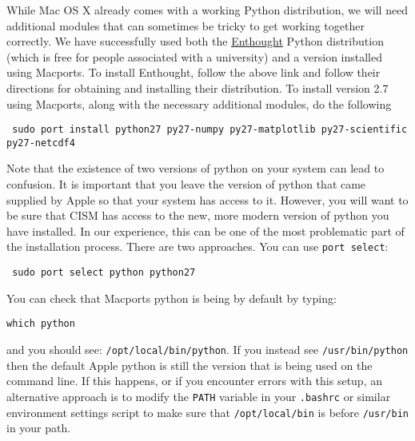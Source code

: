 \begin{mdframed}[style=mac] %
While Mac OS X already comes with a working Python distribution, we will need 
additional modules that can sometimes be tricky to get working together correctly. 
We have successfully used both the 
\href{https://www.enthought.com/products/epd/}{Enthought} Python distribution 
(which is free for people associated with a university) and a version installed 
using Macports.  To install Enthought, follow the above link and follow their 
directions for obtaining and installing their distribution.
To install version 2.7 using Macports, along with the necessary 
additional modules, do the following 

\texttt{
sudo port install python27 py27-numpy py27-matplotlib py27-scientific py27-netcdf4
}

Note that the existence of two versions of python on your system can lead to confusion.
It is important that you leave the version of python that came supplied by Apple so that
your system has access to it.  However, you will want to be sure that CISM has access to
the new, more modern version of python you have installed.  In our experience,
this can be one of the most problematic part of the installation process.  There are two
approaches.  You can use \texttt{port select}:

\texttt{ sudo port select python python27}

You can check that Macports python is being by default by typing:

\texttt{which python}

and you should see: \texttt{/opt/local/bin/python}.  
If you instead see \texttt{/usr/bin/python} then the default Apple python is still 
the version that is being used on the command line.  If this happens, or if you 
encounter errors with this setup, an alternative approach is to modify the 
\texttt{PATH} variable in your \texttt{.bashrc} or similar environment settings script
to make sure that \texttt{/opt/local/bin} is before \texttt{/usr/bin} in your path.
\end{mdframed}              %



